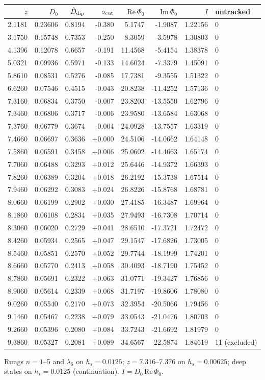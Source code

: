 \begin{tabular}{rrrrrrrl}
\toprule
$z$ & $D_0$ & $\hat D_{\rm dip}$ & $s_{\rm cut}$ & $\mathrm{Re}\,\Phi_0$ & $\mathrm{Im}\,\Phi_0$ & $I$ & untracked\\
\midrule
2.1181 & 0.23606 & 0.8194 & -0.380 & 5.1747 & -1.9087 & 1.22156 & 0\\
3.1750 & 0.15748 & 0.7353 & -0.250 & 8.3059 & -3.5978 & 1.30803 & 0\\
4.1396 & 0.12078 & 0.6657 & -0.191 & 11.4568 & -5.4154 & 1.38378 & 0\\
5.0321 & 0.09936 & 0.5971 & -0.133 & 14.6024 & -7.3379 & 1.45091 & 0\\
5.8610 & 0.08531 & 0.5276 & -0.085 & 17.7381 & -9.3555 & 1.51322 & 0\\
6.6260 & 0.07546 & 0.4515 & -0.043 & 20.8238 & -11.4252 & 1.57136 & 0\\
7.3160 & 0.06834 & 0.3750 & -0.007 & 23.8203 & -13.5550 & 1.62796 & 0\\
7.3460 & 0.06806 & 0.3717 & -0.006 & 23.9580 & -13.6584 & 1.63068 & 0\\
7.3760 & 0.06779 & 0.3674 & -0.004 & 24.0928 & -13.7557 & 1.63319 & 0\\
7.4660 & 0.06697 & 0.3636 & +0.000 & 24.5106 & -14.0662 & 1.64148 & 0\\
7.5860 & 0.06591 & 0.3458 & +0.006 & 25.0602 & -14.4663 & 1.65174 & 0\\
7.7060 & 0.06488 & 0.3293 & +0.012 & 25.6446 & -14.9372 & 1.66393 & 0\\
7.8260 & 0.06389 & 0.3204 & +0.018 & 26.2192 & -15.3738 & 1.67514 & 0\\
7.9460 & 0.06292 & 0.3083 & +0.024 & 26.8226 & -15.8768 & 1.68781 & 0\\
8.0660 & 0.06199 & 0.2902 & +0.030 & 27.4185 & -16.3487 & 1.69964 & 0\\
8.1860 & 0.06108 & 0.2834 & +0.035 & 27.9493 & -16.7308 & 1.70714 & 0\\
8.3060 & 0.06020 & 0.2729 & +0.041 & 28.6510 & -17.3721 & 1.72472 & 0\\
8.4260 & 0.05934 & 0.2565 & +0.047 & 29.1547 & -17.6826 & 1.73005 & 0\\
8.5460 & 0.05851 & 0.2570 & +0.052 & 29.7744 & -18.1999 & 1.74201 & 0\\
8.6660 & 0.05770 & 0.2413 & +0.058 & 30.4093 & -18.7190 & 1.75452 & 0\\
8.7860 & 0.05691 & 0.2322 & +0.063 & 31.0771 & -19.3427 & 1.76856 & 0\\
8.9060 & 0.05614 & 0.2339 & +0.068 & 31.7197 & -19.8606 & 1.78080 & 0\\
9.0260 & 0.05540 & 0.2170 & +0.073 & 32.3954 & -20.5066 & 1.79456 & 0\\
9.1460 & 0.05467 & 0.2238 & +0.079 & 33.0543 & -21.0476 & 1.80703 & 0\\
9.2660 & 0.05396 & 0.2080 & +0.084 & 33.7243 & -21.6692 & 1.81979 & 0\\
9.3860 & 0.05327 & 0.2081 & +0.089 & 34.6567 & -22.5874 & 1.84619 & 11 (excluded)\\
\bottomrule
\end{tabular}

\smallskip\par\footnotesize Rungs $n=1$--5 and $\lambda_6$ on $h_s=0.0125$; $z=7.316$--$7.376$ on $h_s=0.00625$; deep states on $h_s=0.0125$ (continuation). $I=D_0\,\mathrm{Re}\,\Phi_0$.
